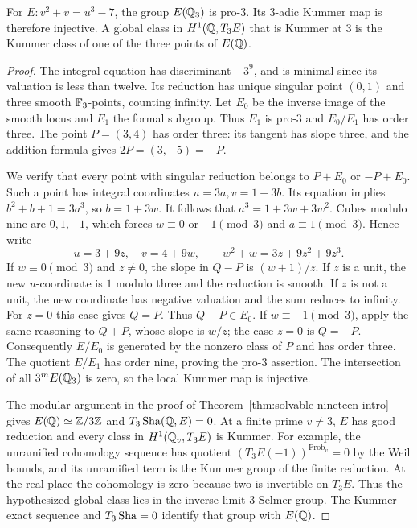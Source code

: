 \begin{lemma}\label{lem:cubiclocal}
For $E:v^2+v=u^3-7$, the group $E(\mathbb Q_3)$ is pro-$3$. Its
$3$-adic Kummer map is therefore injective. A global class in
$H^1(\mathbb Q,T_3E)$ that is Kummer at $3$ is the Kummer class of one of
the three points of $E(\mathbb Q)$.
\end{lemma}
\begin{proof}
The integral equation has discriminant $-3^9$, and is minimal since
its valuation is less than twelve. Its reduction has unique singular
point $(0,1)$ and three smooth $\mathbb F_3$-points, counting infinity.
Let $E_0$ be the inverse image of the smooth locus and $E_1$ the
formal subgroup. Thus $E_1$ is pro-$3$ and $E_0/E_1$ has order three.
The point $P=(3,4)$ has order three: its tangent has slope three,
and the addition formula gives $2P=(3,-5)=-P$.

We verify that every point with singular reduction belongs to
$P+E_0$ or $-P+E_0$. Such a point has integral coordinates
$u=3a,v=1+3b$. Its equation implies $b^2+b+1=3a^3$, so
$b=1+3w$. It follows that $a^3=1+3w+3w^2$. Cubes modulo nine
are $0,1,-1$, which forces $w\equiv0$ or $-1\pmod3$ and
$a\equiv1\pmod3$. Hence write
\[
 u=3+9z,\quad v=4+9w,\qquad
 w^2+w=3z+9z^2+9z^3.
\]
If $w\equiv0\pmod3$ and $z\ne0$, the slope in $Q-P$ is
$(w+1)/z$. If $z$ is a unit, the new $u$-coordinate is $1$ modulo
three and the reduction is smooth. If $z$ is not a unit, the new
coordinate has negative valuation and the sum reduces to infinity.
For $z=0$ this case gives $Q=P$. Thus $Q-P\in E_0$.
If $w\equiv-1\pmod3$, apply the same reasoning to $Q+P$,
whose slope is $w/z$; the case $z=0$ is $Q=-P$.
Consequently $E/E_0$ is generated by the nonzero class of $P$ and
has order three. The quotient $E/E_1$ has order nine, proving the
pro-$3$ assertion. The intersection of all $3^mE(\mathbb Q_3)$ is zero,
so the local Kummer map is injective.

The modular argument in the proof of Theorem~\ref{thm:solvable-nineteen-intro}
gives $E(\mathbb Q)\simeq\mathbb Z/3\mathbb Z$ and $T_3\operatorname{Sha}(\mathbb Q,E)=0$. At a finite
prime $v\ne3$, $E$ has good reduction and every class in
$H^1(\mathbb Q_v,T_3E)$ is Kummer. For example, the unramified cohomology
sequence has quotient $(T_3E(-1))^{\operatorname{Frob}_v}=0$ by
the Weil bounds, and its unramified term is the Kummer group of
the finite reduction. At the real place the cohomology is zero
because two is invertible on $T_3E$. Thus the hypothesized global
class lies in the inverse-limit $3$-Selmer group. The Kummer exact
sequence and $T_3\operatorname{Sha}=0$ identify that group with $E(\mathbb Q)$.
\end{proof}

